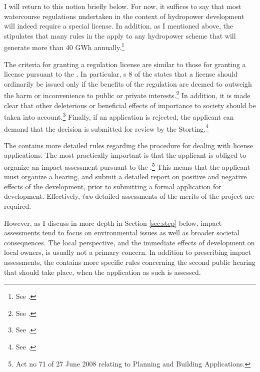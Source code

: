 I will return to this notion briefly below. For now, it suffices to say that most watercourse regulations undertaken in the context of hydropower development will indeed require a special license. In addition, as I mentioned above, the \cite{wra00} stipulates that many rules in the \cite{wra17} apply to any hydropower scheme that will generate more than 40 GWh annually.\footnote{See \cite[19]{wra00}.}

The criteria for granting a regulation license are similar to those for granting a license pursuant to the \cite{wra00}. In particular, s 8 of the \cite{wra17} states that a license should ordinarily be issued only if the benefits of the regulation are deemed to outweigh the harm or inconvenience to public or private interests.\footnote{See \cite[8]{wra17}.} In addition, it is made clear that other deleterious or beneficial effects of importance to society should be taken into account.\footnote{See \cite[8]{wra17}.} Finally, if an application is rejected, the applicant can demand that the decision is submitted for review by the Storting.\footnote{See \cite[8]{wra17}.}

The \cite{wra17} contains more detailed rules regarding the procedure for dealing with license applications. The most practically important is that the applicant is obliged to organize an impact assessment pursuant to the \cite{pb08}.\footnote{Act no 71 of 27 June 2008 relating to Planning and Building Applications.} This means that the applicant must organize a hearing, and submit a detailed report on positive and negative effects of the development, prior to submitting a formal application for development. Effectively, {\it two} detailed assessments of the merits of the project are required. 

However, as I discuss in more depth in Section \ref{sec:step} below, impact assessments tend to focus on environmental issues as well as broader societal consequences. The local perspective, and the immediate effects of development on local owners, is usually not a primary concern. In addition to prescribing impact assessments, the \cite{wra17} contains more specific rules concerning the second public hearing that should take place, when the application as such is assessed. 

